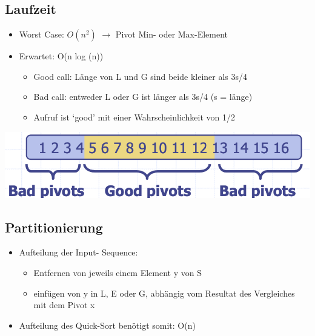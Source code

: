 \subsection{Laufzeit}
\begin{itemize}
    \item Worst Case: $O(n^2)$ $\rightarrow$ Pivot Min- oder Max-Element
    \item Erwartet: O(n log (n))
    \begin{itemize}
        \item Good call: Länge von L und G sind beide kleiner als 3s/4
        \item Bad call: entweder L oder G ist länger als 3s/4 (s = länge)
        \item Aufruf ist ‘good’ mit einer Wahrscheinlichkeit von 1/2
    \end{itemize}
\end{itemize}
\begin{center}
    \includegraphics[scale=.3]{graphic/05 QuickSort/laufzeit.png}
\end{center}
\vspace{-8pt}


\subsection{Partitionierung}
\begin{itemize}
    \item Aufteilung der Input- Sequence:
    \begin{itemize}
        \item Entfernen von jeweils einem Element y von S
        \item einfügen von y in L, E oder G, abhängig vom Resultat des Vergleiches mit dem Pivot x
    \end{itemize}
    \item Aufteilung des Quick-Sort benötigt somit: O(n)
\end{itemize}


